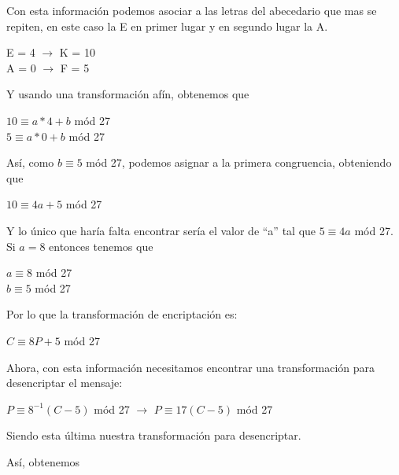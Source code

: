 \documentclass[12pt]{article}
\begin{document}
\par Con esta información podemos asociar a las letras del abecedario que mas se repiten, en este caso la E en primer lugar y en segundo lugar la A.

\begin{center}
    E = 4 $\rightarrow$ K = 10 \\ 
    A = 0 $\rightarrow$ F = 5
\end{center}

Y usando una transformación afín, obtenemos que 
\begin{center}
    $10 \equiv a*4 + b$ mód 27 \\
    $5 \equiv a*0 + b$ mód 27
\end{center}

Así, como $b \equiv 5$ mód 27, podemos asignar a la primera congruencia, obteniendo que 

\begin{center}
    $10 \equiv 4a + 5$ mód 27
\end{center}

Y lo único que haría falta encontrar sería el valor de ``a'' tal que $5 \equiv 4a$ mód 27. Si $a = 8$ entonces tenemos que 

\begin{center}
    $a \equiv 8$ mód 27 \\
    $b \equiv 5$ mód 27
\end{center}


Por lo que la transformación de encriptación es:
\begin{center}
    $C \equiv 8P + 5$ mód 27
\end{center}


Ahora, con esta información necesitamos encontrar una transformación para desencriptar el mensaje:

\begin{center}
    $P \equiv 8^{-1}(C - 5)$ mód 27 $\rightarrow$ $P \equiv 17(C - 5)$ mód 27
\end{center}


Siendo esta última nuestra transformación para desencriptar.

Así, obtenemos
\end{document}
